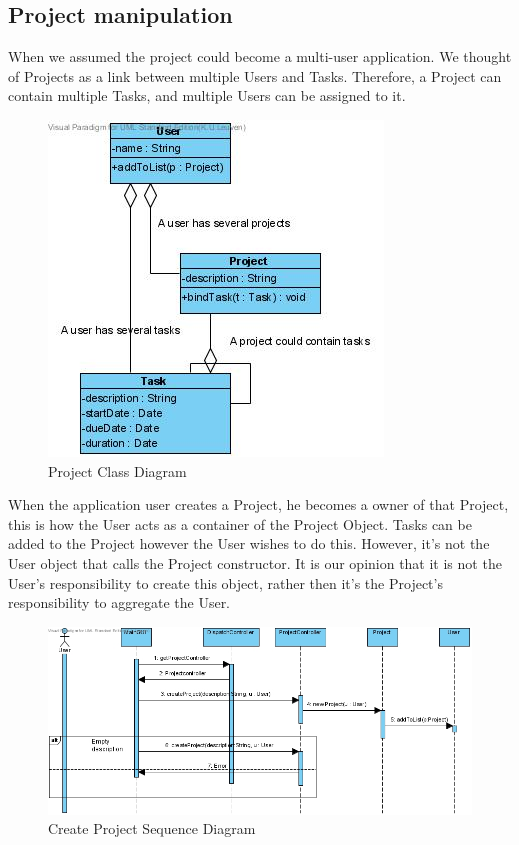 		\subsection{Project manipulation}
			When we assumed the project could become a multi-user application. We thought of Projects as a link between multiple Users and Tasks. Therefore, a Project can contain multiple Tasks, and multiple Users can be assigned to it.
			\begin{figure}[h!]
				\begin{center}
					\includegraphics[scale=0.5]{images/project_class_diagram.jpg}
				\end{center}
				\caption{Project Class Diagram}
			\end{figure}
			When the application user creates a Project, he becomes a owner of that Project, this is how the User acts as a container of the Project Object. Tasks can be added to the Project however the User wishes to do this. However, it's not the User object that calls the Project constructor. It is our opinion that it is not the User's responsibility to create this object, rather then it's the Project's responsibility to aggregate the User.
			\begin{figure}[h!]
				\begin{center}
					\includegraphics[scale=0.5]{images/create_project.jpg}
				\end{center}
				\caption{Create Project Sequence Diagram}
			\end{figure}
